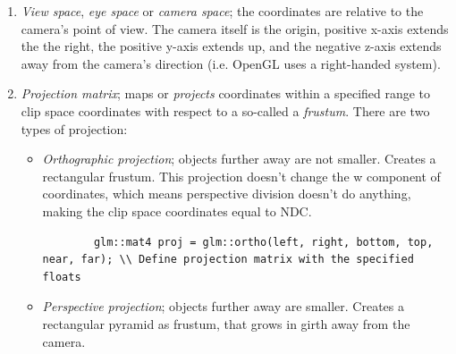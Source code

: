 \documentclass[table, xcdraw]{article}%
\begin{document}
\begin{enumerate}
    \begin{verbatim}
    glm::mat4 view = glm::lookAt(posCamera, posTarget, glm::vec3(0.0f, 1.0f, 0.0f));
    \end{verbatim}
    
    \item \emph{View space}, \emph{eye space} or \emph{camera space}; the coordinates are relative to the camera's point of view. The camera itself is the origin, positive x-axis extends the the right, the positive y-axis extends up, and the negative z-axis extends away from the camera's direction (i.e. OpenGL uses a right-handed system).
    \item[\large$\downarrow$] \emph{Projection matrix}; maps or \emph{projects} coordinates within a specified range to clip space coordinates with respect to a so-called a \emph{frustum}. There are two types of projection:
    \begin{itemize}
        \item \emph{Orthographic projection}; objects further away are not smaller. Creates a rectangular frustum. This projection doesn't change the w component of coordinates, which means perspective division doesn't do anything, making the clip space coordinates equal to NDC.
        
        \begin{verbatim}
        glm::mat4 proj = glm::ortho(left, right, bottom, top, near, far); \\ Define projection matrix with the specified floats
        \end{verbatim}
        
        \item \emph{Perspective projection}; objects further away are smaller. Creates a rectangular pyramid as frustum, that grows in girth away from the camera.
        

\end{itemize}
\end{enumerate}
\end{document}
